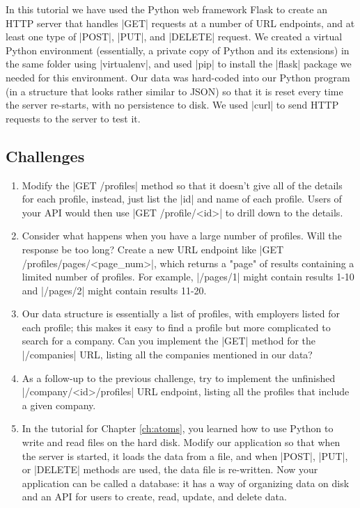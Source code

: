 \documentclass[11pt]{book}
\begin{document}
In this tutorial we have used the Python web framework Flask to create an HTTP server that handles |GET| requests at a number of URL endpoints, and at least one type of |POST|, |PUT|, and |DELETE| request.  We created a virtual Python environment (essentially, a private copy of Python and its extensions) in the same folder using |virtualenv|, and used |pip| to install the |flask| package we needed for this environment.  Our data was hard-coded into our Python program (in a structure that looks rather similar to JSON) so that it is reset every time the server re-starts, with no persistence to disk.  We used |curl| to send HTTP requests to the server to test it.


\subsection*{Challenges}

\begin{enumerate}
    \item Modify the |GET /profiles| method so that it doesn't give all of the details for each profile, instead, just list the |id| and name of each profile.  Users of your API would then use |GET /profile/<id>| to drill down to the details.
    \item Consider what happens when you have a large number of profiles.  Will the response be too long?  Create a new URL endpoint like |GET /profiles/pages/<page_num>|, which returns a "page" of results containing a limited number of profiles.  For example, |/pages/1| might contain results 1-10 and |/pages/2| might contain results 11-20.
    \item Our data structure is essentially a list of profiles, with employers listed for each profile; this makes it easy to find a profile but more complicated to search for a company.  Can you implement the |GET| method for the |/companies| URL, listing all the companies mentioned in our data?
    \item As a follow-up to the previous challenge, try to implement the unfinished |/company/<id>/profiles| URL endpoint, listing all the profiles that include a given company.
    \item In the tutorial for Chapter \ref{ch:atoms}, you learned how to use Python to write and read files on the hard disk.  Modify our application so that when the server is started, it loads the data from a file, and when |POST|, |PUT|, or |DELETE| methods are used, the data file is re-written.  Now your application can be called a database: it has a way of organizing data on disk and an API for users to create, read, update, and delete data.
\end{enumerate}
\end{document}

